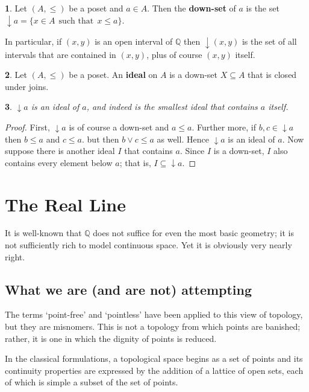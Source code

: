 \documentclass[oneside,english]{amsbook}
\numberwithin{section}{chapter}
\theoremstyle{plain}
\newtheorem{thm}{\protect\theoremname}
\theoremstyle{definition}
\newtheorem{defn}[thm]{\protect\definitionname}
\providecommand{\definitionname}{Definition}
\providecommand{\theoremname}{Theorem}
\begin{document}
\begin{defn}
	Let $(A, \le)$ be a poset and $a\in A$. Then the \textbf{down-set} of $a$ is the set $\downarrow a = \{x\in A\ \ \text{such that}\ \ x\le a\}$.
\end{defn}

In particular, if $(x, y)$ is an open interval of $\mathbb{Q}$ then $\downarrow(x, y)$ is the set of all intervals that are contained in $(x, y)$, plus of course $(x, y)$ itself.

\begin{defn}
	Let $(A, \le)$ be a poset. An \textbf{ideal} on $A$ is a down-set $X\subseteq A$ that is closed under joins.
\end{defn}

\begin{thm}
	$\downarrow a$ is an ideal of $a$, and indeed is the smallest ideal that contains $a$ itself. 
\end{thm}

\begin{proof}
	First, $\downarrow a$ is of course a down-set and $a\le a$. Further more, if $b, c\in \downarrow a$ then $b\le a$ and $c\le a$. but then $b\lor c\le a$ as well. Hence  $\downarrow a$ is an ideal of $a$. Now suppose there is another ideal $I$ that contains $a$. Since $I$ is a down-set, $I$ also contains every element below $a$; that is, $I\subseteq \downarrow a$.
\end{proof}


\section{The Real Line}

It is well-known that $\mathbb{Q}$ does not suffice for even the most basic geometry; it is not sufficiently rich to model continuous space. Yet it is obviously very nearly right. 

\subsection{What we are (and are not) attempting}

The terms `point-free' and `pointless' have been applied to this view of topology, but they are misnomers. This is not a topology from which points are banished; rather, it is one in which the dignity of points is reduced. 

In the classical formulations, a topological space begins as a set of points and its continuity properties are expressed by the addition of a lattice of open sets, each of which is simple a subset of the set of points.
\end{document}
